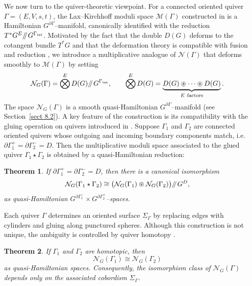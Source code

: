 \documentclass[reqno]{amsart}
\theoremstyle{plain}
\newtheorem{Thm}{Theorem}[section]
\theoremstyle{definition}
\newcommand{\M}{\mathcal{M}}
\newcommand{\N}{\mathcal{N}}
\newcommand{\sll}[1]{\mkern-4mu\mathbin{/\mkern-5mu/}_{\mkern-4mu{#1}}}
\begin{document}
We now turn to the quiver-theoretic viewpoint. For a connected oriented quiver $\Gamma=(E,V,s,t)$, the Lax--Kirchhoff moduli space $\mathcal{M}(\Gamma)$ constructed in \cite[Theorem~3.1, Theorem~5.2]{maiza2025lax} is a Hamiltonian $G^{\partial\Gamma}$--manifold, canonically identified with the reduction $T^{*}G^{E}\sll{} G^{\Gamma_{\mathrm{int}}}$. Motivated by the fact that the double $D(G)$ deforms to the cotangent bundle $T^{*}G$ and that the deformation theory is compatible with fusion and reduction \cite[Theorem~3.3, Corollary~3.2]{JMM2025deformations}, we introduce a multiplicative analogue of $\N(\Gamma)$ that deforms smoothly to $\M(\Gamma)$ by setting
\[
\mathcal{N}_{G}(\Gamma)
=
\bigotimes^{E} D(G)\sll{} G^{\Gamma_{\mathrm{int}}},
\qquad
\bigotimes^{E} D(G)
=
\underbrace{D(G)\circledast\cdots\circledast D(G)}_{E\ \text{factors}}.
\]
The space $\mathcal{N}_{G}(\Gamma)$ is a smooth quasi-Hamiltonian $G^{\partial\Gamma}$--manifold (see Section~\ref{sect 8.2}). 
A key feature of the construction is its compatibility with the gluing operation on quivers introduced in \cite[Section~6]{maiza2025lax}. Suppose $\Gamma_{1}$ and $\Gamma_{2}$ are connected oriented quivers whose outgoing and incoming boundary components match, i.e.\ $\partial\Gamma_{1}^{+}=\partial\Gamma_{2}^{-}=D$. Then the multiplicative moduli space associated to the glued quiver $\Gamma_{1}\star\Gamma_{2}$ is obtained by a quasi-Hamiltonian reduction:

\begin{Thm}
If $\partial\Gamma_{1}^{+}=\partial\Gamma_{2}^{-}=D$, then there is a canonical isomorphism
\[
\mathcal{N}_{G}(\Gamma_{1}\star\Gamma_{2})
\cong
\bigl(\mathcal{N}_{G}(\Gamma_{1})\circledast\mathcal{N}_{G}(\Gamma_{2})\bigr)\sll{} G^{D},
\]
as quasi-Hamiltonian $G^{\partial\Gamma_{1}^{-}}\times G^{\partial\Gamma_{2}^{+}}$--spaces.
\end{Thm}

Each quiver $\Gamma$ determines an oriented surface $\Sigma_{\Gamma}$ by replacing edges with cylinders and gluing along punctured spheres. Although this construction is not unique, the ambiguity is controlled by quiver homotopy \cite[Definition~6.1, Proposition~6.2]{maiza2025lax}.

\begin{Thm}
If $\Gamma_{1}$ and $\Gamma_{2}$ are homotopic, then
\[
\mathcal{N}_{G}(\Gamma_{1})\cong \mathcal{N}_{G}(\Gamma_{2})
\]
as quasi-Hamiltonian spaces. Consequently, the isomorphism class of $\mathcal{N}_{G}(\Gamma)$ depends only on the associated cobordism $\Sigma_{\Gamma}$.
\end{Thm}
\end{document}
